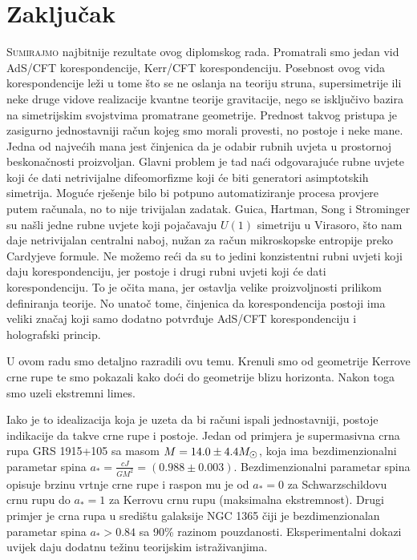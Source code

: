 \chapter{Zaključak}\label{cha:Zaklj}

\lettrine[lines=4]{S} {umirajmo} najbitnije rezultate ovog diplomskog rada. Promatrali smo jedan vid AdS/CFT korespondencije, Kerr/CFT korespondenciju. Posebnost ovog vida korespondencije leži u tome što se ne oslanja na teoriju struna, supersimetrije ili neke druge vidove realizacije kvantne teorije gravitacije, nego se isključivo bazira na simetrijskim svojstvima promatrane geometrije. Prednost takvog pristupa je zasigurno jednostavniji račun kojeg smo morali provesti, no postoje i neke mane. Jedna od najvećih mana jest činjenica da je odabir rubnih uvjeta u prostornoj beskonačnosti proizvoljan. Glavni problem je tad naći odgovarajuće rubne uvjete koji će dati netrivijalne difeomorfizme koji će biti generatori asimptotskih simetrija. Moguće rješenje bilo bi potpuno automatiziranje procesa provjere putem računala, no to nije trivijalan zadatak. Guica, Hartman, Song i Strominger \citep{Guica:2008mu} su našli jedne rubne uvjete koji pojačavaju $U(1)$ simetriju u Virasoro, što nam daje netrivijalan centralni naboj, nužan za račun mikroskopske entropije preko Cardyjeve formule. Ne možemo reći da su to jedini konzistentni rubni uvjeti koji daju korespondenciju, jer postoje i drugi rubni uvjeti \citep{Matsuo:2009sj, Matsuo:2009pg} koji će dati korespondenciju. To je očita mana, jer ostavlja velike proizvoljnosti prilikom definiranja teorije. No unatoč tome, činjenica da korespondencija postoji ima veliki značaj koji samo dodatno potvrđuje AdS/CFT korespondenciju i holografski princip.

U ovom radu smo detaljno razradili ovu temu. Krenuli smo od geometrije Kerrove crne rupe te smo pokazali kako doći do geometrije blizu horizonta. Nakon toga smo uzeli ekstremni limes. 

Iako je to idealizacija koja je uzeta da bi računi ispali jednostavniji, postoje indikacije da takve crne rupe i postoje. Jedan od primjera je supermasivna crna rupa GRS 1915+105 \citep{supermasiv1} sa masom $M=14.0\pm 4.4M_{\small{\astrosun}}$, koja ima bezdimenzionalni parametar spina $a_*=\frac{cJ}{GM^2}=(0.988\pm 0.003)$. Bezdimenzionalni parametar spina opisuje brzinu vrtnje crne rupe i raspon mu je od $a_*=0$ za Schwarzschildovu crnu rupu do $a_*=1$ za Kerrovu crnu rupu (maksimalna ekstremnost). Drugi primjer je crna rupa u središtu galaksije NGC 1365 čiji je bezdimenzionalan parametar spina $a_*>0.84$ sa 90\% razinom pouzdanosti. Eksperimentalni dokazi uvijek daju dodatnu težinu teorijskim istraživanjima.

